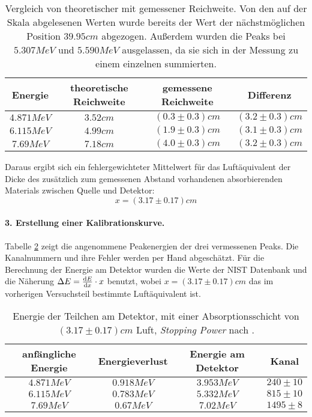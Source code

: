 \documentclass{../Misc/MontavonLaTeX/Montavon}
\begin{document}
\begin{table}[htbp]
\centering
\begin{tabular}{|c|c|c|c|}
\hline
Energie & theoretische Reichweite & gemessene Reichweite & Differenz \\
\hline
$4.871 \unit{MeV}$ & $3.52 \unit{cm}$ & $(0.3 \pm 0.3) \unit{cm}$ & $(3.2 \pm 0.3) \unit{cm} $ \\
$6.115 \unit{MeV}$ & $4.99 \unit{cm}$ & $(1.9 \pm 0.3) \unit{cm}$ & $(3.1 \pm 0.3) \unit{cm} $ \\
$7.69 \unit{MeV}$ & $7.18 \unit{cm}$ & $(4.0 \pm 0.3) \unit{cm}$ & $(3.2 \pm 0.3) \unit{cm} $ \\
\hline 
\end{tabular}
\caption{Vergleich von theoretischer mit gemessener Reichweite. Von den auf der Skala abgelesenen Werten wurde bereits der Wert der nächstmöglichen Position $39.95 \unit{cm}$ abgezogen. Außerdem wurden die Peaks bei $5.307 \unit{MeV}$ und $5.590 \unit{MeV}$ ausgelassen, da sie sich in der Messung zu einem einzelnen summierten.}
\label{tbl:radium_distanz_vergleich}
\end{table}

Daraus ergibt sich ein fehlergewichteter Mittelwert für das Luftäquivalent der Dicke des zusätzlich zum gemessenen Abstand vorhandenen absorbierenden Materials zwischen Quelle und Detektor:
\[
	x = (3.17 \pm 0.17) \unit{cm}
\]


\paragraph{3. Erstellung einer Kalibrationskurve.}
Tabelle \ref{tbl:radium_kalibration} zeigt die angenommene Peakenergien der drei vermessenen Peaks. Die Kanalnummern und ihre Fehler werden per Hand abgeschätzt. Für die Berechnung der Energie am Detektor wurden die Werte der NIST Datenbank \cite{nist_alpha} und die Näherung $\Delta E = \frac{\mathrm d E}{\mathrm d x} \cdot x$ benutzt, wobei $x = (3.17 \pm 0.17) \unit{cm}$ das im vorherigen Versuchsteil bestimmte Luftäquivalent ist.

\begin{table}[htbp]
\centering
\begin{tabular}{|c|c|c||c|}
\hline
anfängliche Energie & Energieverlust & Energie am Detektor & Kanal \\
\hline 
$4.871 \unit{MeV}$ & $0.918 \unit{MeV}$ & $3.953 \unit{MeV}$ & $240 \pm 10$ \\
$6.115 \unit{MeV}$ & $0.783 \unit{MeV}$ & $5.332 \unit{MeV}$ & $815 \pm 10$ \\
$7.69 \unit{MeV}$ & $0.67 \unit{MeV}$ & $7.02 \unit{MeV}$ & $1495 \pm 8$ \\
\hline
\end{tabular}
\caption{Energie der Teilchen am Detektor, mit einer Absorptionsschicht von $(3.17 \pm 0.17) \unit{cm}$ Luft, \emph{Stopping Power} nach \cite{nist_alpha}.}
\label{tbl:radium_kalibration}
\end{table}
\end{document}
